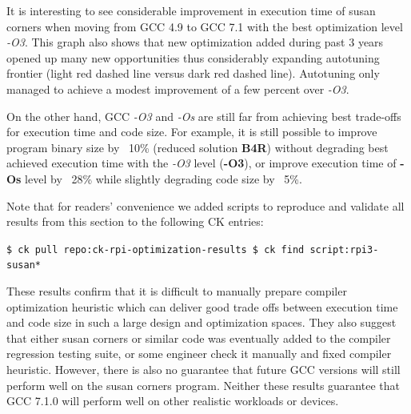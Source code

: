 It is interesting to see considerable improvement in execution time of susan corners 
when moving from GCC 4.9 to GCC 7.1 with the best optimization level \textit{-O3}.
%
This graph also shows that new optimization added during past 3 years opened up
many new opportunities thus considerably expanding autotuning frontier (light red
dashed line versus dark red dashed line).
%
Autotuning only managed to achieve a modest improvement of a few percent over \textit{-O3}.

On the other hand, GCC \textit{-O3} and \textit{-Os} are still far from achieving
best trade-offs for execution time and code size.
%
For example, it is still possible to improve program binary size 
by ~10\% (reduced solution \textbf{B4R}) without degrading best achieved 
execution time with the \textit{-O3} level (\textbf{-O3}), or improve 
execution time of \textbf{-Os} level by ~28\% while slightly degrading code size by ~5\%.

Note that for readers' convenience we added scripts to reproduce and validate 
all results from this section to the following CK entries:

\begin{flushleft}
\texttt{\$ ck pull repo:ck-rpi-optimization-results \newline
\$ ck find script:rpi3-susan*}
\end{flushleft}

These results confirm that it is difficult to manually prepare compiler optimization
heuristic which can deliver good trade offs between execution time and code size 
in such a large design and optimization spaces.
%
They also suggest that either susan corners or similar code 
was eventually added to the compiler regression testing suite,
or some engineer check it manually and fixed compiler heuristic.
%
However, there is also no guarantee that future GCC versions will still
perform well on the susan corners program.
%
Neither these results guarantee that GCC 7.1.0
will perform well on other realistic workloads or devices.
